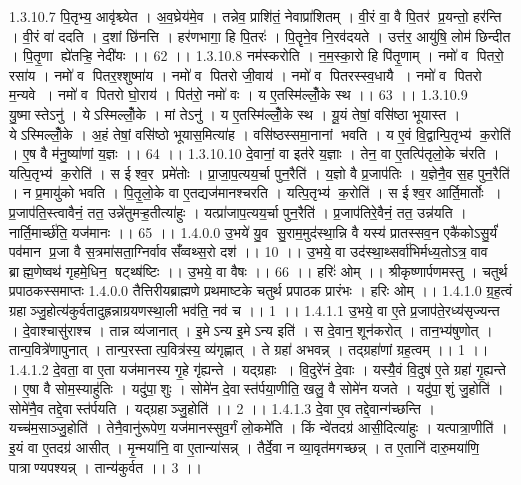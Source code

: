 1.3.10.7
पि॒तृभ्य॒ आवृ॑श्च्येत । अ॒व॒घ्रेय॑मे॒व । तन्नेव॒ प्राशि॑तं॒ नेवाप्रा॑शितम् । वी॒रं वा॒ वै पि॒तर॑ प्र॒यन्तो॒ हर॑न्ति । वी॒रं वा॑ ददति । द॒शां छि॑नत्ति । हर॑णभागा॒ हि पि॒तरः॑ । पि॒तॄने॒व नि॒रव॑दयते । उत्त॑र॒ आयु॑षि॒ लोम॑ छिन्दीत । पि॒तृ॒णा ह्ये॑तऱ्हि॒ नेदी॑यः ।। 62 ।।
1.3.10.8
नम॑स्करोति । न॒म॒स्का॒रो हि पि॑तृ॒णाम् । नमो॑ व पितरो॒ रसा॑य । नमो॑ व पितर॒श्शुष्मा॑य । नमो॑ व पितरो जी॒वाय॑ । नमो॑ व पितरस्स्व॒धायै । नमो॑ व पितरो म॒न्यवे । नमो॑ व पितरो घो॒राय॑ । पित॑रो॒ नमो॑ वः । य ए॒तस्मि॑ल्लोँ॒के स्थ ।। 63 ।।
1.3.10.9
यु॒ष्मास्तेऽनु॑ । येऽस्मिल्लोँ॒के । मां तेऽनु॑ । य ए॒तस्मि॑ल्लोँ॒के स्थ । यू॒यं तेषां॒ वसि॑ष्ठा भूयास्त । येऽस्मिल्लोँ॒के । अ॒हं तेषां॒ वसि॑ष्ठो भूयास॒मित्या॑ह । वसि॑ष्ठस्समा॒नानां भवति । य ए॒वं वि॒द्वान्पि॒तृभ्य॑ क॒रोति॑ । ए॒ष वै म॑नु॒ष्या॑णां य॒ज्ञः ।। 64 ।।
1.3.10.10
दे॒वानां॒ वा इत॑रे य॒ज्ञाः । तेन॒ वा ए॒तत्पि॑तृलो॒के च॑रति । यत्पि॒तृभ्य॑ क॒रोति॑ । स ईश्व॒र प्रमे॑तोः । प्रा॒जा॒प॒त्यय॒र्चा पुन॒रैति॑ । य॒ज्ञो वै प्र॒जाप॑तिः । य॒ज्ञेनै॒व स॒ह पुन॒रैति॑ । न प्र॒मायु॑को भवति । पि॒तृ॒लो॒के वा ए॒तद्यज॑मानश्चरति । यत्पि॒तृभ्य॑ क॒रोति॑ । स ईश्व॒र आर्ति॒मार्तोः । प्र॒जाप॑ति॒स्त्वावैनं॒ तत॒ उन्ने॑तुमऱ्ह॒तीत्या॑हुः । यत्प्रा॑जाप॒त्यय॒र्चा पुन॒रैति॑ । प्र॒जाप॑तिरे॒वैनं॒ तत॒ उन्न॑यति । नार्ति॒मार्च्छ॑ति॒ यज॑मानः ।। 65 ।।
1.4.0.0
उ॒भये॑ यु॒व सु॒राम॒मुद॑स्था॒न्नि वै यस्य॑ प्रातस्सव॒न एकै॑कोऽसु॒र्यं॑ पव॑मान प्र॒जा वै स॒त्रमा॑सता॒ग्निर्वाव सँ॑व्वथ्स॒रो दश॑ ।। 10 ।। उ॒भये॒ वा उद॑स्था॒थ्सर्वा॑भिर्मध्य॒तोऽत्र॒ वाव ब्राह्म॒णेष्वथ॑ गृहमे॒धिन॒॒ षट्थ्ष॑ष्टिः ।। उ॒भये॒ वा वैषः ।। 66 ।। हरिः॑ ओम् ।। श्रीकृष्णार्पणमस्तु । चतुर्थ प्रपाठकस्समाप्तः
1.4.0.0
तैत्तिरीयब्राह्मणे प्रथमाष्टके चतुर्थ प्रपाठक प्रारंभः । हरिः ओम् ।।
1.4.1.0
ग्र॒ह॒त्वं ग्रहाञ्जु॒होत्य॑कुर्वतादुह्रन्नाग्रयणस्था॒ली भव॑ति॒ नव॑ च ।। 1 ।।
1.4.1.1
उ॒भये॒ वा ए॒ते प्र॒जाप॑ते॒रध्य॑सृज्यन्त । दे॒वाश्चासु॑राश्च । तान्न व्य॑जानात् । इ॒मेऽन्य इ॒मेऽन्य इति॑ । स दे॒वान॒॒शून॑करोत् । तान॒भ्य॑षुणोत् । तान्प॒वित्रे॑णापुनात् । तान्प॒रस्तात्प॒वित्र॑स्य॒ व्य॑गृह्णात् । ते ग्रहा॑ अभवन्न् । तद्ग्रहा॑णां ग्रह॒त्वम् ।। 1 ।।
1.4.1.2
दे॒वता॒ वा ए॒ता यज॑मानस्य गृ॒हे गृ॑ह्यन्ते । यद्ग्रहाः । वि॒दुरे॑नं दे॒वाः । यस्यै॒वं वि॒दुष॑ ए॒ते ग्रहा॑ गृ॒ह्यन्ते । ए॒षा वै सोम॒स्याहु॑तिः । यदु॑पा॒॒शुः । सोमे॑न दे॒वास्त॑र्पया॒णीति॒ खलु॒ वै सोमे॑न यजते । यदु॑पा॒॒शुं जु॒होति॑ । सोमे॑नै॒व तद्दे॒वास्त॑र्पयति । यद्ग्रहाञ्जु॒होति॑ ।। 2 ।।
1.4.1.3
दे॒वा ए॒व तद्दे॒वान्ग॑च्छन्ति । यच्च॑म॒साञ्जु॒होति॑ । तेनै॒वानु॑रूपेण॒ यज॑मानस्सुव॒र्गं लो॒कमे॑ति । किं न्वे॑तदग्र॑ आसी॒दित्या॑हुः । यत्पात्रा॒णीति॑ । इ॒यं वा ए॒तदग्र॑ आसीत् । मृ॒न्मया॑नि॒ वा ए॒तान्या॑सन्न् । तैर्दे॒वा न व्या॒वृत॑मगच्छन्न् । त ए॒तानि॑ दारु॒मया॑णि॒ पात्राण्यपश्यन्न् । तान्य॑कुर्वत ।। 3 ।।
